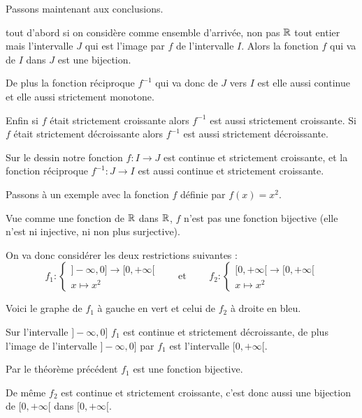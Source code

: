 Passons maintenant aux conclusions.


tout d'abord si on considère comme ensemble d'arrivée, non pas $\mathbb{R}$ tout entier 
mais l'intervalle $J$ qui est l'image par $f$ de l'intervalle $I$. Alors la 
fonction $f$ qui va de $I$ dans $J$ est une bijection.


\change 

De plus la fonction réciproque $f^{-1}$ qui va donc de $J$ vers $I$ est elle aussi continue 
et elle aussi strictement monotone.

Enfin si $f$ était strictement croissante alors $f^{-1}$ est aussi strictement croissante.
Si $f$ était strictement décroissante alors $f^{-1}$ est aussi strictement décroissante.


\change

Sur le dessin notre fonction $f : I \to J$ est continue et strictement croissante,
et la fonction réciproque $f^{-1} : J \to I$ est aussi continue et strictement croissante.


\diapo

Passons à un exemple avec la fonction $f$ définie par $f(x)=x^2$.

Vue comme une fonction de $\mathbb{R}$ dans $\mathbb{R}$, $f$ n'est pas une fonction bijective (elle n'est ni injective, 
ni non plus surjective).


\change

On va donc considérer les deux restrictions suivantes :
\[
f_1 :
\left\{\begin{array}{c}
]-\infty,0] \longrightarrow [0,+\infty[ \\
x \longmapsto x^2
\end{array}\right.
\qquad \text{et } \qquad
f_2 : 
\left\{\begin{array}{c}
[0,+\infty[ \longrightarrow [0,+\infty[ \\
x \longmapsto x^2
\end{array}\right.
\]

\change

Voici le graphe de $f_1$ à gauche en vert  et celui de $f_2$ à droite en bleu.

Sur l'intervalle $]-\infty,0]$ $f_1$ est continue et strictement décroissante,
de plus l'image de l'intervalle $]-\infty,0]$ par  $f_1$ est l'intervalle $[0,+\infty[$.

Par le théorème précédent $f_1$ est une fonction bijective.

De même $f_2$ est continue et strictement croissante, c'est donc aussi une bijection 
de $[0,+\infty[$ dans $[0,+\infty[$.



